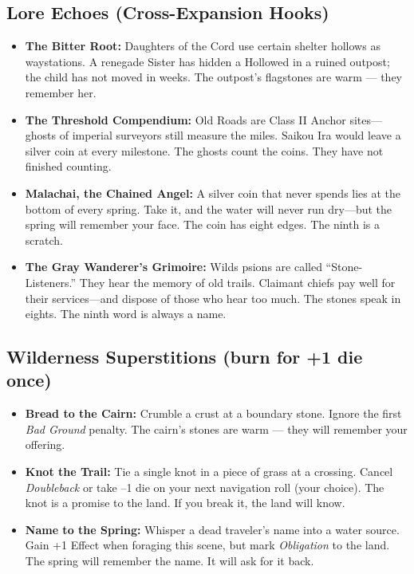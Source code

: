 \subsection*{Lore Echoes (Cross-Expansion Hooks)}
\begin{itemize}
  \item \textbf{The Bitter Root:} Daughters of the Cord use certain shelter hollows as waystations. A renegade Sister has hidden a Hollowed in a ruined outpost; the child has not moved in weeks. The outpost's flagstones are warm --- they remember her.
  \item \textbf{The Threshold Compendium:} Old Roads are Class II Anchor sites---ghosts of imperial surveyors still measure the miles. Saikou Ira would leave a silver coin at every milestone. The ghosts count the coins. They have not finished counting.
  \item \textbf{Malachai, the Chained Angel:} A silver coin that never spends lies at the bottom of every spring. Take it, and the water will never run dry---but the spring will remember your face. The coin has eight edges. The ninth is a scratch.
  \item \textbf{The Gray Wanderer's Grimoire:} Wilds psions are called ``Stone-Listeners.'' They hear the memory of old trails. Claimant chiefs pay well for their services---and dispose of those who hear too much. The stones speak in eights. The ninth word is always a name.
\end{itemize}

\subsection*{Wilderness Superstitions (burn for +1 die once)}
\begin{itemize}
  \item \textbf{Bread to the Cairn:} Crumble a crust at a boundary stone. Ignore the first \emph{Bad Ground} penalty. The cairn's stones are warm --- they will remember your offering.
  \item \textbf{Knot the Trail:} Tie a single knot in a piece of grass at a crossing. Cancel \emph{Doubleback} or take --1 die on your next navigation roll (your choice). The knot is a promise to the land. If you break it, the land will know.
  \item \textbf{Name to the Spring:} Whisper a dead traveler's name into a water source. Gain +1 Effect when foraging this scene, but mark \emph{Obligation} to the land. The spring will remember the name. It will ask for it back.
\end{itemize}

